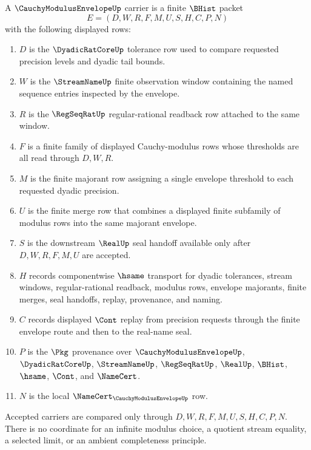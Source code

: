\begin{definition}
\label{def:cauchy-modulus-envelope-carrier}
A $\CauchyModulusEnvelopeUp$ carrier is a finite $\BHist$ packet
$$
E=(D,W,R,F,M,U,S,H,C,P,N)
$$
with the following displayed rows:
\begin{enumerate}
\item $D$ is the $\DyadicRatCoreUp$ tolerance row used to compare requested precision levels and dyadic tail bounds.
\item $W$ is the $\StreamNameUp$ finite observation window containing the named sequence entries inspected by the envelope.
\item $R$ is the $\RegSeqRatUp$ regular-rational readback row attached to the same window.
\item $F$ is a finite family of displayed Cauchy-modulus rows whose thresholds are all read through $D,W,R$.
\item $M$ is the finite majorant row assigning a single envelope threshold to each requested dyadic precision.
\item $U$ is the finite merge row that combines a displayed finite subfamily of modulus rows into the same majorant envelope.
\item $S$ is the downstream $\RealUp$ seal handoff available only after $D,W,R,F,M,U$ are accepted.
\item $H$ records componentwise $\hsame$ transport for dyadic tolerances, stream windows, regular-rational readback, modulus rows, envelope majorants, finite merges, seal handoffs, replay, provenance, and naming.
\item $C$ records displayed $\Cont$ replay from precision requests through the finite envelope route and then to the real-name seal.
\item $P$ is the $\Pkg$ provenance over $\CauchyModulusEnvelopeUp$, $\DyadicRatCoreUp$, $\StreamNameUp$, $\RegSeqRatUp$, $\RealUp$, $\BHist$, $\hsame$, $\Cont$, and $\NameCert$.
\item $N$ is the local $\NameCert_{\CauchyModulusEnvelopeUp}$ row.
\end{enumerate}
Accepted carriers are compared only through $D,W,R,F,M,U,S,H,C,P,N$. There is no coordinate for an infinite modulus choice, a quotient stream equality, a selected limit, or an ambient completeness principle.
\end{definition}

